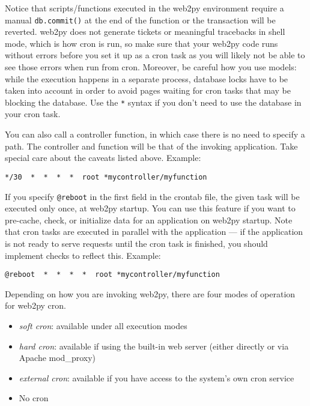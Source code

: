 \documentclass[justified,sixbynine,notoc]{tufte-book}
\def\ft{\small\tt}
\begin{document}
\begin{fullwidth}
Notice that scripts/functions executed in the web2py environment require a manual {\ft db.commit()} at the end of the function or the transaction will be reverted.
\noindent web2py does not generate tickets or meaningful tracebacks in shell mode, which is how cron is run, so make sure that your web2py code runs without errors before you set it up as a cron task as you will likely not be able to see those errors when run from cron. Moreover, be careful how you use models: while the execution happens in a separate process, database locks have to be taken into account in order to avoid pages waiting for cron tasks that may be blocking the database. Use the {\ft **} syntax if you don't need to use the database in your cron task.

You can also call a controller function, in which case there is no need to specify a path. The controller and function will be that of the invoking application. Take special care about the caveats listed above. Example:
\begin{lstlisting}
*/30  *  *  *  *  root *mycontroller/myfunction
\end{lstlisting}

If you specify {\ft @reboot} in the first field in the crontab file, the given task will be executed only once, at web2py startup. You can use this feature if you want to pre-cache, check, or initialize data for an application on web2py startup. Note that cron tasks are executed in parallel with the application --- if the application is not ready to serve requests until the cron task is finished, you should implement checks to reflect this. Example:
\begin{lstlisting}
@reboot  *  *  *  *  root *mycontroller/myfunction
\end{lstlisting}

Depending on how you are invoking web2py, there are four modes of operation for web2py cron.
\begin{itemize}
\item {\it soft cron}: available under all execution modes

\item {\it hard cron}: available if using the built-in web server (either directly or via Apache mod\_proxy)

\item {\it external cron}: available if you have access to the system's own cron service

\item No cron
\end{itemize}


\end{fullwidth}
\end{document}
